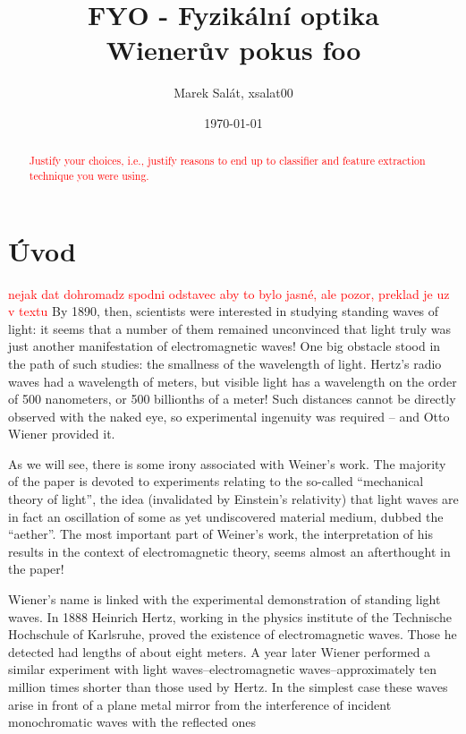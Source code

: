 \documentclass[12pt,a4paper,titlepage,final]{report}
\title{FYO - Fyzikální optika\\Wienerův pokus foo}
\author{Marek Salát, xsalat00}
\date{\today}
\newcommand\todo[1]{\textcolor{red}{#1}}
\begin{document}
\lstset{language=Matlab}

\maketitle

\pagestyle{plain}
\setcounter{page}{1}
\tableofcontents

\newpage
\begin{abstract}
\todo{Justify your choices, i.e., justify reasons to end up to classifier and feature extraction technique you were using.}
\end{abstract}

\newpage
\pagestyle{plain}
\setcounter{page}{1}

\section{Úvod}
\todo{nejak dat dohromadz spodni odstavec aby to bylo jasné, ale pozor, preklad je uz v textu}
By 1890, then, scientists were interested in studying standing waves of light: it seems that a number of them remained unconvinced that light truly was just another manifestation of electromagnetic waves! One big obstacle stood in the path of such studies: the smallness of the wavelength of light. Hertz’s radio waves had a wavelength of meters, but visible light has a wavelength on the order of 500 nanometers, or 500 billionths of a meter! Such distances cannot be directly observed with the naked eye, so experimental ingenuity was required – and Otto Wiener provided it.

As we will see, there is some irony associated with Weiner’s work. The majority of the paper is devoted to experiments relating to the so-called “mechanical theory of light”, the idea (invalidated by Einstein’s relativity) that light waves are in fact an oscillation of some as yet undiscovered material medium, dubbed the “aether”. The most important part of Weiner’s work, the interpretation of his results in the context of electromagnetic theory, seems almost an afterthought in the paper!

Wiener’s name is linked with the experimental demonstration of standing light waves. In 1888 Heinrich Hertz, working in the physics institute of the Technische Hochschule of Karlsruhe, proved the existence of electromagnetic waves. Those he detected had lengths of about eight meters. A year later Wiener performed a similar experiment with light waves–electromagnetic waves–approximately ten million times shorter than those used by Hertz. In the simplest case these waves arise in front of a plane metal mirror from the interference of incident monochromatic waves with the reflected ones
 
\end{document}
